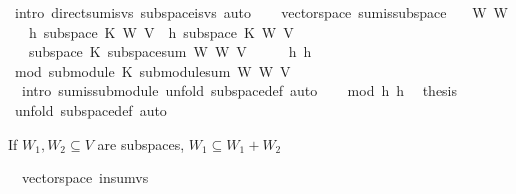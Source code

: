 \begin{isabellebody}
\ {\isacharparenleft}intro\ direct{\isacharunderscore}sum{\isacharunderscore}is{\isacharunderscore}vs\ subspace{\isacharunderscore}is{\isacharunderscore}vs{\isacharcomma}\ auto{\isacharparenright}\isacommand{{\isachardot}{\isachardot}}\isamarkupfalse%
\ \isanewline
{}\isamarkupfalse%
%
\endisatagproof
{\isafoldproof}%
%
\isadelimproof
\isanewline
%
\endisadelimproof
\isanewline
{}\isamarkupfalse%
\ {\isacharparenleft}\ vectorspace{\isacharparenright}\ sum{\isacharunderscore}is{\isacharunderscore}subspace{\isacharcolon}\isanewline
\ \ \ W{}\ W{}\isanewline
\ \ \ h{}{\isacharcolon}\ {\isachardoublequoteopen}subspace\ K\ W{}\ V{\isachardoublequoteclose}\ \ h{}{\isacharcolon}\ {\isachardoublequoteopen}subspace\ K\ W{}\ V{\isachardoublequoteclose}\isanewline
\ \ \ {\isachardoublequoteopen}subspace\ K\ {\isacharparenleft}subspace{\isacharunderscore}sum\ W{}\ W{}{\isacharparenright}\ V{\isachardoublequoteclose}\isanewline
%
\isadelimproof
%
\endisadelimproof
%
\isatagproof
{}\isamarkupfalse%
\ {\isacharminus}\isanewline
\ \ \isamarkupfalse%
\ h{}\ h{}\ \isamarkupfalse%
\ mod{\isacharcolon}\ {\isachardoublequoteopen}submodule\ K\ {\isacharparenleft}submodule{\isacharunderscore}sum\ W{}\ W{}{\isacharparenright}\ V{\isachardoublequoteclose}\ \isanewline
\ \ \ \ \isamarkupfalse%
\ {\isacharparenleft}\ intro\ sum{\isacharunderscore}is{\isacharunderscore}submodule{\isacharcomma}\ unfold\ subspace{\isacharunderscore}def{\isacharcomma}\ auto{\isacharparenright}\isanewline
\ \ \isamarkupfalse%
\ mod\ h{}\ h{}\ \isamarkupfalse%
\ {\isacharquery}thesis\ \isanewline
\ \ \ \ \isamarkupfalse%
\ {\isacharparenleft}unfold\ subspace{\isacharunderscore}def{\isacharcomma}\ auto{\isacharparenright}\isanewline
{}\isamarkupfalse%
%
\endisatagproof
{\isafoldproof}%
%
\isadelimproof
%
\endisadelimproof
%
\begin{isamarkuptext}%
If $W_1,W_2\subseteq V$ are subspaces, $W_1\subseteq W_1 + W_2$%
\end{isamarkuptext}%
\isamarkuptrue%
\isamarkupfalse%
\ {\isacharparenleft}\ vectorspace{\isacharparenright}\ in{\isacharunderscore}sum{\isacharunderscore}vs{\isacharcolon}\isanewline

\end{isabellebody}
